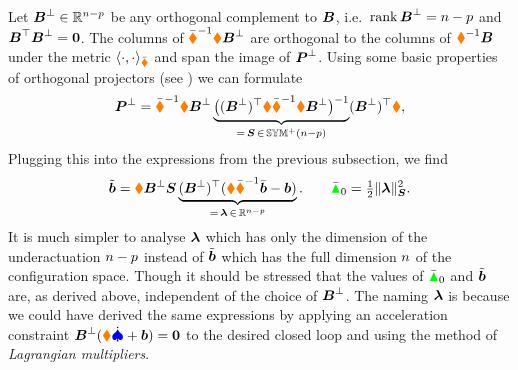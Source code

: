 Let $\sysInputMatLComp \in \RealNum^{\dimConfigSpace-\numInputs}$ be any orthogonal complement to $\sysInputMat$, i.e.\ $\rank \sysInputMatLComp = \dimConfigSpace-\numInputs$ and $\sysInputMat^\top \sysInputMatLComp = \mat{0}$.
The columns of $\sysInertiaMatC^{-1} \sysInertiaMat \sysInputMatLComp$ are orthogonal to the columns of $\sysInertiaMat^{-1} \sysInputMat$ under the metric $\sProd[\sysInertiaMatC]{\cdot}{\cdot}$ and span the image of $\mat{P}^\bot$.
Using some basic properties of orthogonal projectors (see ) we can formulate
\begin{align}
 \mat{P}^\bot = \sysInertiaMatC^{-1} \sysInertiaMat \sysInputMatLComp \underbrace{\big( (\sysInputMatLComp)^\top \sysInertiaMat \sysInertiaMatC^{-1} \sysInertiaMat \sysInputMatLComp \big)^{-1}}_{=\,\mat{S}\,\in\,\SymMatP(\dimConfigSpace-\numInputs)} (\sysInputMatLComp)^\top \sysInertiaMat,
\end{align}
Plugging this into the expressions from the previous subsection, we find 
\begin{align}\label{eq:DefMatchingForce}
 \tilde{\tuple{b}} = \sysInertiaMat \sysInputMatLComp \mat{S} \underbrace{(\sysInputMatLComp)^\top (\sysInertiaMat \sysInertiaMatC^{-1} \sysForceC - \sysForce)}_{=\,\tuple{\lambda}\,\in\,\RealNum^{\dimConfigSpace-\numInputs}}.
\qquad
 \GaussianConstraintC_0 = \tfrac{1}{2} \norm[\mat{S}]{\tuple{\lambda}}^2.
\end{align}
It is much simpler to analyse $\tuple{\lambda}$ which has only the dimension of the underactuation $\dimConfigSpace-\numInputs$ instead of $\tilde{\tuple{b}}$ which has the full dimension $\dimConfigSpace$ of the configuration space.
Though it should be stressed that the values of $\GaussianConstraintC_0$ and $\tilde{\tuple{b}}$ are, as derived above, independent of the choice of $\sysInputMatLComp$.
The naming $\tuple{\lambda}$ is because we could have derived the same expressions by applying an acceleration constraint $\sysInputMatLComp(\sysInertiaMat \sysVeld + \sysForce)=\tuple{0}$ to the desired closed loop and using the method of \textit{Lagrangian multipliers}.

